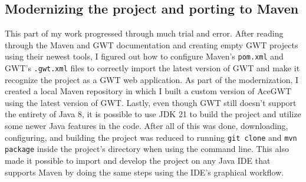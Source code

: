 \subsection*{Modernizing the project and porting to Maven}

This part of my work progressed through much trial and error. After reading through the Maven and GWT documentation and creating empty GWT projects using their newest tools, I figured out how to configure Maven's \verb|pom.xml| and GWT's \verb|.gwt.xml| files to correctly import the latest version of GWT and make it recognize the project as a GWT web application. As part of the modernization, I created a local Maven repository in which I built a custom version of AceGWT using the latest version of GWT. Lastly, even though GWT still doesn't support the entirety of Java 8, it is possible to use JDK 21 to build the project and utilize some newer Java features in the code.
\newline
After all of this was done, downloading, configuring, and building the project was reduced to running \verb|git clone| and \verb|mvn package| inside the project's directory when using the command line. This also made it possible to import and develop the project on any Java IDE that supports Maven by doing the same steps using the IDE's graphical workflow.